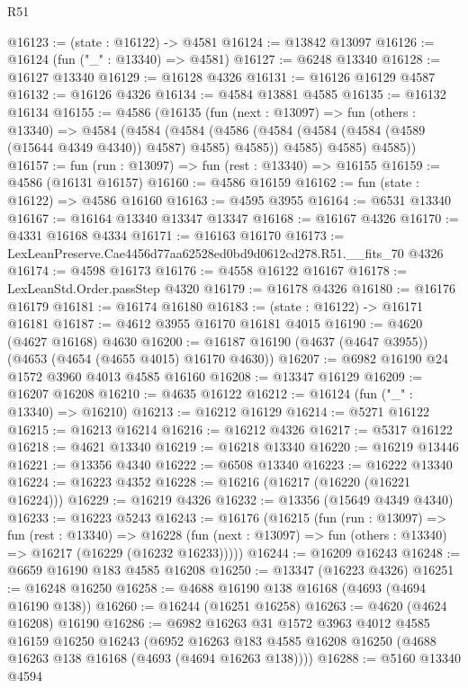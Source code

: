 \begin{lexlean}{R51}
\begin{coremodule}
@16123 := (state : @16122) -> @4581
@16124 := @13842 @13097
@16126 := @16124 (fun ("_" : @13340) => @4581)
@16127 := @6248 @13340
@16128 := @16127 @13340
@16129 := @16128 @4326
@16131 := @16126 @16129 @4587
@16132 := @16126 @4326
@16134 := @4584 @13881 @4585
@16135 := @16132 @16134
@16155 := @4586
    (@16135
      (fun (next : @13097) =>
      fun (others : @13340) =>
      @4584
        (@4584
          (@4584
            (@4586 (@4584 (@4584 (@4584 (@4589 (@15644 @4349 @4340)) @4587) @4585) @4585))
            @4585)
          @4585)
        @4585))
@16157 := fun (run : @13097) => fun (rest : @13340) => @16155
@16159 := @4586 (@16131 @16157)
@16160 := @4586 @16159
@16162 := fun (state : @16122) => @4586 @16160
@16163 := @4595 @3955
@16164 := @6531 @13340
@16167 := @16164 @13340 @13347 @13347
@16168 := @16167 @4326
@16170 := @4331 @16168 @4334
@16171 := @16163 @16170
@16173 := LexLeanPreserve.Cae4456d77aa62528ed0bd9d0612cd278.R51.__fits_70 @4326
@16174 := @4598 @16173
@16176 := @4558 @16122 @16167
@16178 := LexLeanStd.Order.passStep @4320
@16179 := @16178 @4326
@16180 := @16176 @16179
@16181 := @16174 @16180
@16183 := (state : @16122) -> @16171 @16181
@16187 := @4612 @3955 @16170 @16181 @4015
@16190 := @4620 (@4627 @16168) @4630
@16200 := @16187 @16190 (@4637 (@4647 @3955)) (@4653 (@4654 (@4655 @4015) @16170 @4630))
@16207 := @6982 @16190 @24 @1572 @3960 @4013 @4585 @16160
@16208 := @13347 @16129
@16209 := @16207 @16208
@16210 := @4635 @16122
@16212 := @16124 (fun ("_" : @13340) => @16210)
@16213 := @16212 @16129
@16214 := @5271 @16122
@16215 := @16213 @16214
@16216 := @16212 @4326
@16217 := @5317 @16122
@16218 := @4621 @13340
@16219 := @16218 @13340
@16220 := @16219 @13446
@16221 := @13356 @4340
@16222 := @6508 @13340
@16223 := @16222 @13340
@16224 := @16223 @4352
@16228 := @16216 (@16217 (@16220 (@16221 @16224)))
@16229 := @16219 @4326
@16232 := @13356 (@15649 @4349 @4340)
@16233 := @16223 @5243
@16243 := @16176
    (@16215
      (fun (run : @13097) =>
      fun (rest : @13340) =>
      @16228 (fun (next : @13097) => fun (others : @13340) => @16217 (@16229 (@16232 @16233)))))
@16244 := @16209 @16243
@16248 := @6659 @16190 @183 @4585 @16208
@16250 := @13347 (@16223 @4326)
@16251 := @16248 @16250
@16258 := @4688 @16190 @138 @16168 (@4693 (@4694 @16190 @138))
@16260 := @16244 (@16251 @16258)
@16263 := @4620 (@4624 @16208) @16190
@16286 := @6982
    @16263
    @31
    @1572
    @3963
    @4012
    @4585
    @16159
    @16250
    @16243
    (@6952 @16263 @183 @4585 @16208 @16250 (@4688 @16263 @138 @16168 (@4693 (@4694 @16263 @138))))
@16288 := @5160 @13340 @4594

\end{coremodule}
\end{lexlean}
